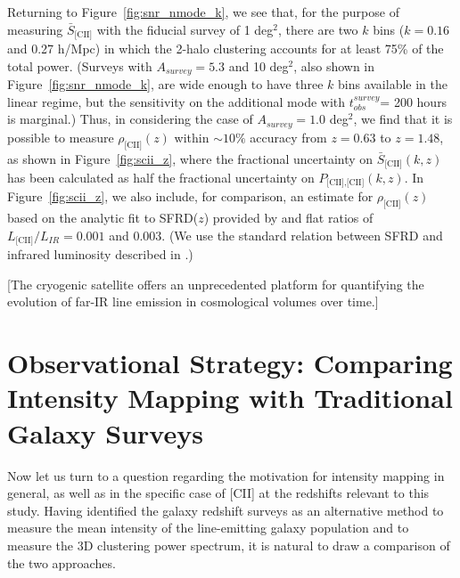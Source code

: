 \documentclass[iop]{emulateapj}
\begin{document}
Returning to Figure~\ref{fig:snr_nmode_k}, we see that, for the purpose of measuring $\bar{S}_{\textrm{[CII]}}$ with the fiducial survey of 1 deg$^2$, there are two $k$ bins ($k = 0.16$ and 0.27 h/Mpc) in which the 2-halo clustering accounts for at least 75\% of the total power. (Surveys with $A_{survey} = 5.3$ and 10 deg$^2$, also shown in Figure~\ref{fig:snr_nmode_k}, are wide enough to have three $k$ bins available in the linear regime, but the sensitivity on the additional mode with $t_{obs}^{survey}$= 200 hours is marginal.) Thus, in considering the case of $A_{survey} = 1.0$ deg$^2$, we find that it is possible to measure $\rho_{\textrm{[CII]}}(z)$ within $\sim10\%$ accuracy from $z = 0.63$ to $z=1.48$, as shown in Figure~\ref{fig:scii_z}, where the fractional uncertainty on $\bar{S}_{\textrm{[CII]}}(k,z)$ has been calculated as half the fractional uncertainty on $P_{\textrm{[CII],[CII]}}(k,z)$. In Figure~\ref{fig:scii_z}, we also include, for comparison, an estimate for $\rho_{\textrm{[CII]}}(z)$ based on the analytic fit to SFRD($z$) provided by \citet{hb06} and flat ratios of $L_{\textrm{[CII]}}/L_{IR} = 0.001$ and 0.003. (We use the standard relation between SFRD and infrared luminosity described in \citet{kennicutt98}.)

[The cryogenic satellite offers an unprecedented platform for quantifying the evolution of far-IR line emission in cosmological volumes over time.] 

\section{Observational Strategy: Comparing Intensity Mapping with Traditional Galaxy Surveys}

Now let us turn to a question regarding the motivation for intensity mapping in general, as well as in the specific case of [CII] at the redshifts relevant to this study. Having identified the galaxy redshift surveys as an alternative method to measure the mean intensity of the line-emitting galaxy population and to measure the 3D clustering power spectrum, it is natural to draw a comparison of the two approaches. 
\end{document}
